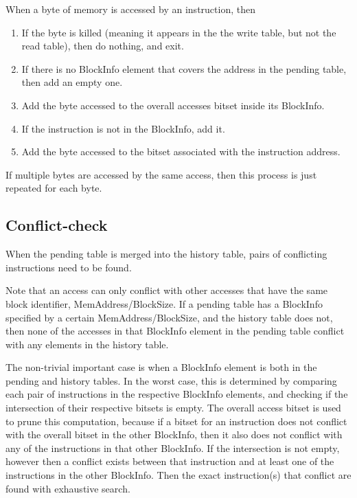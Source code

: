 \documentclass[12pt,twoside]{reedthesis}
\begin{document}
			When a byte of memory is accessed by an instruction, then
			
			\begin{enumerate}
				\item If the byte is killed (meaning it appears in the the write table, but not the read table), then do nothing, and exit.  
				\item If there is no BlockInfo element that covers the address in the pending table, then add an empty one. 
				\item Add the byte accessed to the overall accesses bitset inside its BlockInfo.
				\item If the instruction is not in the BlockInfo, add it.
				\item Add the byte accessed to the bitset associated with the instruction address.
			\end{enumerate}
			
			If multiple bytes are accessed by the same access, then this process is just repeated for each byte. 
			
			
			\subsection{Conflict-check}
			
			When the pending table is merged into the history table, pairs of conflicting instructions need to be found. 
			
			Note that an access can only conflict with other accesses that have the same block identifier, MemAddress/BlockSize. If a pending table has a BlockInfo specified by a certain MemAddress/BlockSize, and the history table does not, then none of the accesses in that BlockInfo element in the pending table conflict with any elements in the history table. 
			
			The non-trivial important case is when a BlockInfo element is both in the pending and history tables. 
			In the worst case, this is determined by comparing each pair of instructions in the respective BlockInfo elements, and checking if the intersection of their respective bitsets is empty. The overall access bitset is used to prune this computation, because if a bitset for an instruction does not conflict with the overall bitset in the other BlockInfo, then it also does not conflict with any of the instructions in that other BlockInfo. If the intersection is not empty, however then a conflict exists between that instruction and at least one of the instructions in the other BlockInfo. Then the exact instruction(s) that conflict are found with exhaustive search.  %
			
\end{document}
